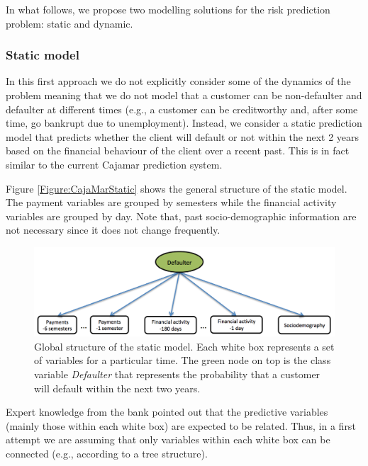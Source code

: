 In what follows, we propose two modelling solutions for the risk prediction problem: static and dynamic.

\subsubsection*{Static model} 

In this first approach we do not explicitly consider some of the dynamics of the problem meaning that we do not model that a customer can be non-defaulter and defaulter at different times (e.g., a customer can be creditworthy and, after some time, go bankrupt due to unemployment). Instead, we consider a static prediction model that predicts whether the client will default or not within the next 2 years based on the financial behaviour of the client over a recent past. This is in fact similar to the current Cajamar prediction system. 

Figure \ref{Figure:CajaMarStatic} shows the general structure of the static model. The payment variables are grouped by semesters while the financial activity variables are grouped by day. Note that, past socio-demographic information are not necessary since it does not change frequently.

\begin{figure}[ht!]
  \centering
\includegraphics[scale=0.35]{./figures/CajaMarModel0}
\caption{\label{Figure:CajaMarStatic}Global structure of the static model. Each white box represents a set of variables for a particular time. The green node on top is the class variable \emph{Defaulter} that represents the probability that a customer will default within the next two years. } 
\label{fig:CajamarStaticModel}
\end{figure}

Expert knowledge from the bank pointed out that the predictive variables (mainly those within each white box) are expected to be related. Thus, in a first attempt we are assuming that only variables within each white box can be connected (e.g., according to a tree structure).

